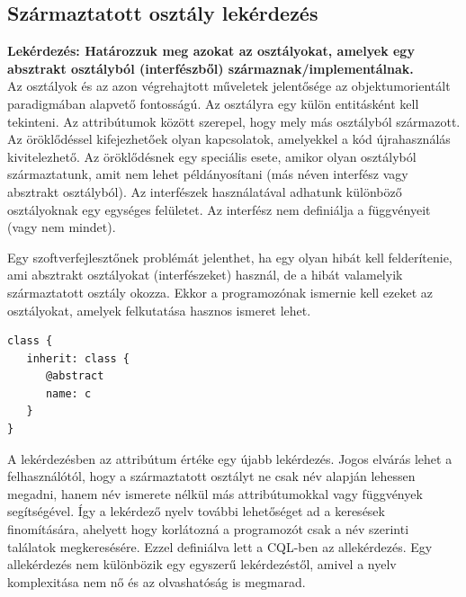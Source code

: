 \documentclass[a4paper,12pt]{report}
\begin{document}
\subsection{Származtatott osztály lekérdezés}
\textbf{Lekérdezés: Határozzuk meg azokat az osztályokat, amelyek egy absztrakt osztályból (interfészből) származnak/implementálnak.}
\\
Az osztályok és az azon végrehajtott műveletek jelentősége az objektumorientált paradigmában alapvető fontosságú. Az osztályra egy külön entitásként kell tekinteni. Az attribútumok között szerepel, hogy mely más osztályból származott. Az öröklődéssel kifejezhetőek olyan kapcsolatok, amelyekkel a kód újrahasználás kivitelezhető. Az öröklődésnek egy speciális esete, amikor olyan osztályból származtatunk, amit nem lehet példányosítani (más néven interfész vagy absztrakt osztályból). Az interfészek használatával adhatunk különböző osztályoknak egy egységes felületet. Az interfész nem definiálja a függvényeit (vagy nem mindet). 
\par Egy szoftverfejlesztőnek problémát jelenthet, ha egy olyan hibát kell felderítenie, ami absztrakt osztályokat (interfészeket) használ, de a hibát valamelyik származtatott osztály okozza. Ekkor a programozónak ismernie kell ezeket az osztályokat, amelyek felkutatása hasznos ismeret lehet.
\begin{verbatim}
class {
   inherit: class { 
      @abstract
      name: c
   }
}
\end{verbatim}
\par A lekérdezésben az attribútum értéke egy újabb lekérdezés. Jogos elvárás lehet a felhasználótól, hogy a származtatott osztályt ne csak név alapján lehessen megadni, hanem név ismerete nélkül más attribútumokkal vagy függvények segítségével. Így a lekérdező nyelv további lehetőséget ad a keresések finomítására, ahelyett hogy korlátozná a programozót csak a név szerinti találatok megkeresésére. Ezzel definiálva lett a CQL-ben az allekérdezés. Egy allekérdezés nem különbözik egy egyszerű lekérdezéstől, amivel a nyelv komplexitása nem nő és az olvashatóság is megmarad. 
\end{document}
